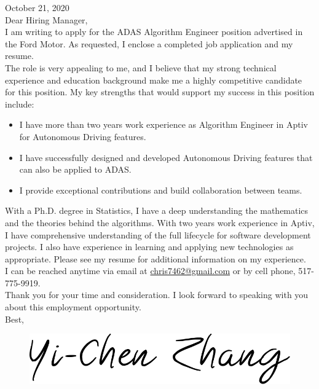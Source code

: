 \documentclass[a4paper,12pt,dvipdfmx]{article}
\begin{document}
\noindent October 21, 2020\\

\noindent Dear Hiring Manager,\\

\noindent I am writing to apply for the ADAS Algorithm Engineer position advertised in the Ford Motor. As requested, I enclose a completed job application and my resume.\\

\noindent The role is very appealing to me, and I believe that my strong technical experience and education background make me a highly competitive candidate for this position. My key strengths that would support my success in this position include:
\begin{itemize}
  \item I have more than two years work experience as Algorithm Engineer in Aptiv for Autonomous Driving features.
  \item I have successfully designed and developed Autonomous Driving features that can also be applied to ADAS.
  \item I provide exceptional contributions and build collaboration between teams.
\end{itemize}

\noindent With a Ph.D. degree in Statistics, I have a deep understanding the mathematics and the theories behind the algorithms. With two years work experience in Aptiv, I have comprehensive understanding of the full lifecycle for software development projects. I also have experience in learning and applying new technologies as appropriate. Please see my resume for additional information on my experience.\\

\noindent I can be reached anytime via email at \href{mailto:chris7462@gmail.com}{chris7462@gmail.com} or by cell phone, 517-775-9919.\\

\noindent Thank you for your time and consideration. I look forward to speaking with you about this employment opportunity.\\

\noindent Best,

\begin{figure}[!ht]
  \includegraphics[scale=0.12]{./Signature.png}
\end{figure}
\end{document}
